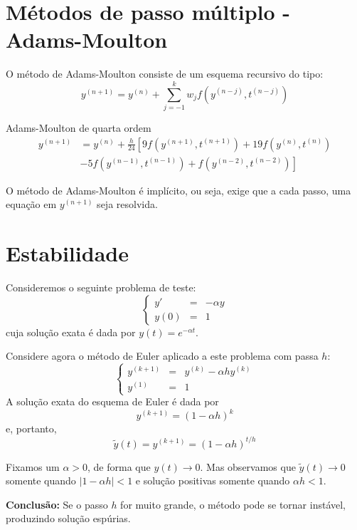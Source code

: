 \section{Métodos de passo múltiplo - Adams-Moulton}

O método de Adams-Moulton consiste de um esquema recursivo do tipo:
$$y^{(n+1)}=y^{(n)}+\sum_{j=-1}^k w_jf(y^{(n-j)},t^{(n-j)})$$

\begin{ex} Adams-Moulton de quarta ordem
  \begin{equation*}
    \begin{split}
      y^{(n+1)} &= y^{(n)} + \frac{h}{24}\left[9f\left(y^{(n+1)},t^{(n+1)}\right) + 19f\left(y^{(n)},t^{(n)}\right) \right.\\
      &-\left. 5f\left(y^{(n-1)},t^{(n-1)}\right) + f\left(y^{(n-2)},t^{(n-2)}\right)\right]      
    \end{split}
  \end{equation*}
$$$$
\end{ex}
O método de Adams-Moulton é implícito, ou seja, exige que a cada passo, uma equação em $y^{(n+1)}$ seja resolvida.

\section{Estabilidade}

Consideremos o seguinte problema de teste:
$$\left\{\begin{array}{rcl}y'&=&-\alpha y\\y(0)&=&1\end{array}\right.$$
cuja solução exata é dada por $y(t)=e^{-\alpha t}$.

Considere agora o método de Euler aplicado a este problema com passa $h$:
$$\left\{\begin{array}{rcl}y^{(k+1)}&=&y^{(k)}-\alpha h y^{(k)}\\y^{(1)}&=&1\end{array}\right.$$
A solução exata do esquema de Euler é dada por
$$y^{(k+1)}=(1-\alpha h)^{k}$$
e, portanto,
$$\tilde{y}(t)=y^{(k+1)}=(1-\alpha h)^{t/h}$$

Fixamos um $\alpha>0$, de forma que $y(t)\to 0$. Mas observamos que $\tilde{y}(t)\to 0$ somente quando $|1-\alpha h|<1$ e solução positivas somente quando $\alpha h<1$.

{\bf Conclusão:} Se o passo $h$ for muito grande, o método pode se tornar instável, produzindo solução espúrias.

